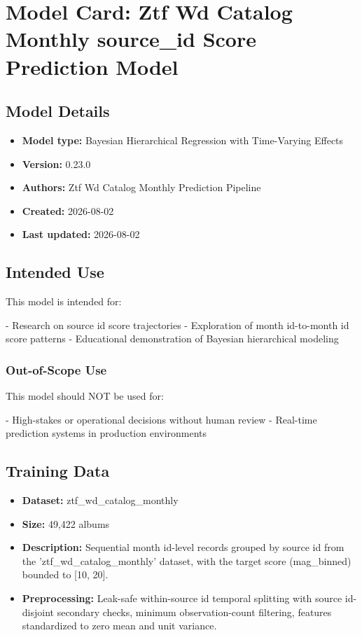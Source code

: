 \documentclass{article}
\begin{document}
\section*{Model Card: Ztf Wd Catalog Monthly source\_id Score Prediction Model}

\subsection*{Model Details}
\begin{itemize}
  \item \textbf{Model type:} Bayesian Hierarchical Regression with Time-Varying Effects
  \item \textbf{Version:} 0.23.0
  \item \textbf{Authors:} Ztf Wd Catalog Monthly Prediction Pipeline
  \item \textbf{Created:} 2026-08-02
  \item \textbf{Last updated:} 2026-08-02
\end{itemize}

\subsection*{Intended Use}
This model is intended for:

- Research on source id score trajectories
- Exploration of month id-to-month id score patterns
- Educational demonstration of Bayesian hierarchical modeling

\subsubsection*{Out-of-Scope Use}
This model should NOT be used for:

- High-stakes or operational decisions without human review
- Real-time prediction systems in production environments

\subsection*{Training Data}
\begin{itemize}
  \item \textbf{Dataset:} ztf\_wd\_catalog\_monthly
  \item \textbf{Size:} 49,422 albums
  \item \textbf{Description:} Sequential month id-level records grouped by source id from the 'ztf\_wd\_catalog\_monthly' dataset, with the target score (mag\_binned) bounded to [10, 20].
  \item \textbf{Preprocessing:} Leak-safe within-source id temporal splitting with source id-disjoint secondary checks, minimum observation-count filtering, features standardized to zero mean and unit variance.
\end{itemize}
\end{document}
